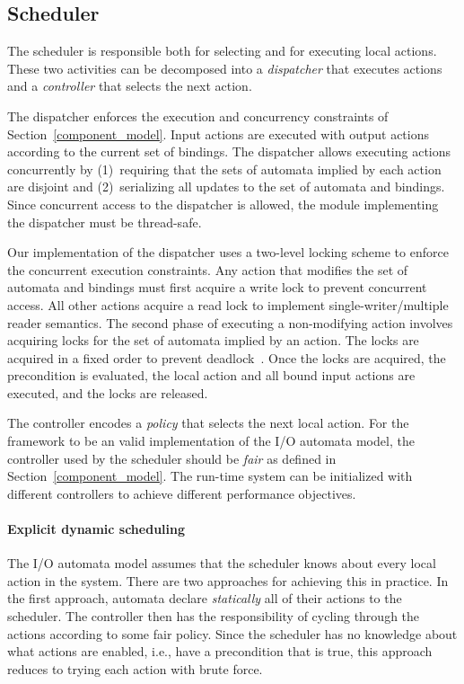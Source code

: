 \subsection{Scheduler\label{scheduling}}

The scheduler is responsible both for selecting and for executing local actions.
These two activities can be decomposed into a \emph{dispatcher} that executes actions and a \emph{controller} that selects the next action.

The dispatcher enforces the execution and concurrency constraints of Section~\ref{component_model}.
Input actions are executed with output actions according to the current set of bindings.
The dispatcher allows executing actions concurrently by (1)~requiring that the sets of automata implied by each action are disjoint and (2)~serializing all updates to the set of automata and bindings.
Since concurrent access to the dispatcher is allowed, the module implementing the dispatcher must be thread-safe.

Our implementation of the dispatcher uses a two-level locking scheme to enforce the concurrent execution constraints.
Any action that modifies the set of automata and bindings must first acquire a write lock to prevent concurrent access.
All other actions acquire a read lock to implement single-writer/multiple reader semantics.
The second phase of executing a non-modifying action involves acquiring locks for the set of automata implied by an action.
The locks are acquired in a fixed order to prevent deadlock~\cite{havender1968avoiding}.
Once the locks are acquired, the precondition is evaluated, the local action and all bound input actions are executed, and the locks are released.

The controller encodes a \emph{policy} that selects the next local action.
For the framework to be an valid implementation of the I/O automata model, the controller used by the scheduler should be \emph{fair} as defined in Section~\ref{component_model}.
The run-time system can be initialized with different controllers to achieve different performance objectives.

\paragraph*{Explicit dynamic scheduling}
The I/O automata model assumes that the scheduler knows about every local action in the system.
There are two approaches for achieving this in practice.
In the first approach, automata declare \emph{statically} all of their actions to the scheduler.
The controller then has the responsibility of cycling through the actions according to some fair policy.
Since the scheduler has no knowledge about what actions are enabled, i.e., have a precondition that is true, this approach reduces to trying each action with brute force.

